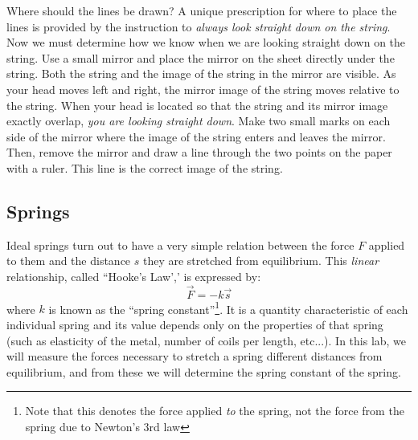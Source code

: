 Where should the lines be drawn?  A unique prescription for where to place the lines is provided by the instruction to \emph{always look straight down on the string}. Now we must determine how we know when we are looking straight down on the string. Use a small mirror and place the mirror on the sheet directly under the string. Both the string and the image of the string in the mirror are visible. As your head moves left and right, the mirror image of the string moves relative to the string. When your head is located so that the string and its mirror image exactly overlap, \emph{you are looking straight down}. Make two small marks on each side of the mirror where the image of the string enters and leaves the mirror. Then, remove the mirror and draw a line through the two points on the paper with a ruler. This line is the correct image of the string.

\subsection{Springs}

Ideal springs turn out to have a very simple relation between the force $F$ applied to them and the distance $s$ they are stretched from equilibrium. This \emph{linear} relationship, called ``Hooke's Law',' is expressed by:
\begin{equation}
  \vec  F = -k \vec s
\end{equation}
where $k$ is known as the ``spring constant''\footnote{Note that this denotes the force applied \emph{to} the spring, not the force from the spring due to Newton's 3rd law}. It is a quantity characteristic of each individual spring and its value depends only on the properties of that spring (such as elasticity of the metal, number of coils per length, etc...). In this lab, we will measure the forces necessary to stretch a spring different distances from equilibrium, and from these we will determine the spring constant of the spring.


